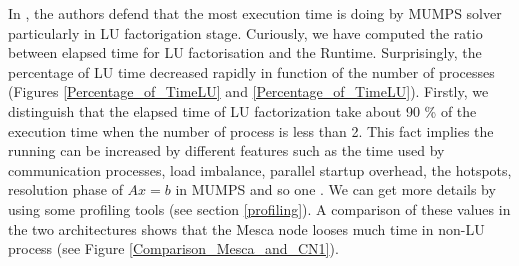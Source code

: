 In \cite{Operto2007}, the authors defend that the most execution time is doing by MUMPS solver particularly in LU factorigation stage. Curiously, we have computed the ratio between elapsed time for LU factorisation and the Runtime. Surprisingly, the percentage of LU time decreased rapidly in function of the number of processes (Figures \ref{Percentage_of_TimeLU} and \ref{Percentage_of_TimeLU}). Firstly, we distinguish that the elapsed time of LU factorization take about 90 \% of the execution time when the number of process is less than 2.  This fact implies the running can be increased by different features such as the time used by communication processes, load imbalance, parallel startup overhead, the hotspots, resolution phase of $Ax = b$ in MUMPS and so one . We can get more details by using some profiling tools (see section \ref{profiling}). A comparison of these values in the two architectures shows that the Mesca node looses much time in non-LU process (see Figure \ref{Comparison_Mesca_and_CN1}). 


